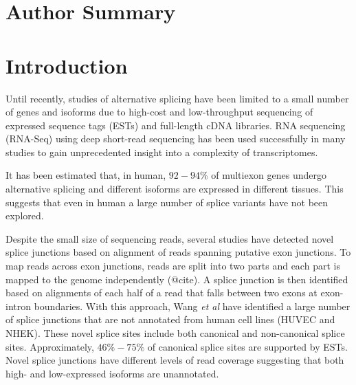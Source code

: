 \documentclass[10pt]{article}
\begin{document}



\section*{Author Summary}

\section*{Introduction}

Until recently, studies of alternative splicing have been limited to a
small number of genes and isoforms due to high-cost and low-throughput
sequencing of expressed sequence tags (ESTs) and full-length cDNA
libraries.  RNA sequencing (RNA-Seq) using deep short-read sequencing
has been used successfully in many studies to gain unprecedented
insight into a complexity of transcriptomes.

It has been estimated that, in human, $92-94$\% of multiexon genes
undergo alternative splicing and different isoforms are expressed in
different tissues\cite{Wang:2008ea}.  This suggests that even in human
a large number of splice variants have not been explored.


Despite the small size of sequencing reads, several studies have
detected novel splice junctions based on alignment of reads spanning
putative exon junctions.  To map reads across exon junctions,
reads are split into two parts and each part is mapped to the genome
independently (@cite).  A splice junction is then identified based on
alignments of each half of a read that falls between two exons at
exon-intron boundaries.  With this approach, Wang \emph{et al} have
identified a large number of splice junctions that are not annotated
from human cell lines (HUVEC and NHEK)\cite{Wang:2011jq}.  These novel
splice sites include both canonical and non-canonical splice sites.
Approximately, $46\%-75\%$ of canonical splice sites are supported by
ESTs.  Novel splice junctions have different levels of read coverage
suggesting that both high- and low-expressed isoforms are unannotated.
\end{document}
